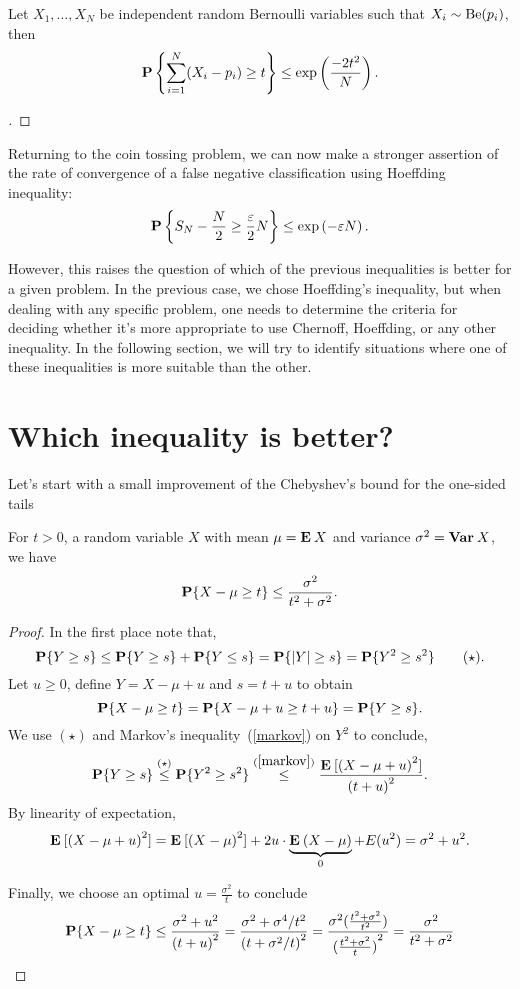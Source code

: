 \begin{corollary}
  Let $X_1,\ldots, X_N$ be independent random Bernoulli variables such that $X_i \sim \Be(p_i)$, then
  \[ \P\left\{ \sum_{i = 1}^N (X_i - p_i) \geq t\right\} \leq \exp\left( \frac{-2t^2}{N}\right). \] 
\end{corollary}

\begin{proof}[]

\end{proof}

Returning to the coin tossing problem, we can now make a stronger assertion of the rate of convergence of a false negative classification using Hoeffding inequality:
\[\P \left\{S_N- \frac{N}{2} \geq \frac{\varepsilon}{2} N \right\} \leq \exp\left( - \varepsilon N \right). \] 

However, this raises the question of which of the previous inequalities is better for a given problem. In the previous case, we chose Hoeffding's inequality, but when dealing with any specific problem, one needs to determine the criteria for deciding whether it's more appropriate to use Chernoff, Hoeffding, or any other inequality. In the following section, we will try to identify situations where one of these inequalities is more suitable than the other.

\section{Which inequality is better?}
Let's start with a small improvement of the Chebyshev's bound for the one-sided tails

\begin{theorem}\label{cantelli}
  For $t > 0$, a random variable $X$ with mean $\mu = \E X$ and variance $\sigma^2 = \Var X$, we have
  \[ \P\{X-\mu \geq t\} \leq \frac{\sigma^2}{t^2 + \sigma^2}. \] 
\end{theorem}

\begin{proof}
  In the first place note that,
  \[ \P\{ Y \geq s\} \leq \P\{ Y \geq s\} + \P\{ Y \leq s\} = \P\{|Y| \geq s\} = \P\{ Y^2 \geq s^2\} \tag*{($\star$)}. \] 
  Let $u \geq 0$, define $Y = X-\mu + u$ and $s = t+u$ to obtain
  \[ \P\{X-\mu \geq t\} = \P\{X-\mu + u \geq t + u\} = \P\{Y \geq s\}. \]
  We use $(\star)$ and Markov's inequality~(\ref{markov}) on $Y^2$ to conclude,
  \[ \P\{Y \geq s\} \overset{(\star)}{\leq} \P\{ Y^2 \geq s^2\} \overset{(\ref{markov})}{\leq} \frac{\E[{(X-\mu+u)}^2]}{{(t+u)}^2}.\]
  By linearity of expectation,
  \[ \E[{(X-\mu+u)}^2] = \E[{(X-\mu)}^2] + 2u \cdot \underbrace{\E(X-\mu)}_{0} + E(u^2) = \sigma^2 + u^2. \]

  Finally, we choose an optimal $u = \frac{\sigma^2}{t}$ to conclude
  \[
    \P\{X-\mu \geq t\} \leq \frac{\sigma^2 + u^2}{{(t+u)}^2}
     = \frac{\sigma^2 + \sigma^4/t^2}{{{(t+\sigma^2/t)}^2}}
     = \frac{\sigma^2 (\tfrac{t^2+\sigma^2}{t^2})}{{(\tfrac{t^2+\sigma^2}{t})}^2}
     = \frac{\sigma^2}{t^2+\sigma^2}\]
\end{proof}

